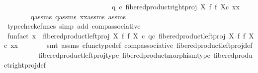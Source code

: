 \begin{isabellebody}
\ \ \ \ \ \ \ \ \ \ \ \ \ \ \ \ \ \ \ \ \ \ \ \ \ \ \ \ \ \ \ q{}\ {\isasymcirc}\isactrlsub c\ {\isacharparenleft}{\kern0pt}{\isacharparenleft}{\kern0pt}fibered{\isacharunderscore}{\kern0pt}product{\isacharunderscore}{\kern0pt}right{\isacharunderscore}{\kern0pt}proj\ X\ f\ f\ X{\isacharparenright}{\kern0pt}{\isasymcirc}\isactrlsub c\ xx{\isacharparenright}{\kern0pt}{\isachardoublequoteclose}\isanewline
\ \ \ \ \ \ \isamarkupfalse%
\ q{}{\isacharunderscore}{\kern0pt}assms\ q{}{\isacharunderscore}{\kern0pt}assms\ xx{\isacharunderscore}{\kern0pt}assms\ assms\ \isamarkupfalse%
\ {\isacharparenleft}{\kern0pt}typecheck{\isacharunderscore}{\kern0pt}cfuncs{\isacharcomma}{\kern0pt}\ simp\ add{\isacharcolon}{\kern0pt}\ comp{\isacharunderscore}{\kern0pt}associative{}{\isacharparenright}{\kern0pt}\isanewline
\ \ \ \ \isamarkupfalse%
\ \isamarkupfalse%
\ fun{\isacharunderscore}{\kern0pt}fact{\isacharcolon}{\kern0pt}\ {\isachardoublequoteopen}x\ {\isacharequal}{\kern0pt}\ {\isacharparenleft}{\kern0pt}{\isacharparenleft}{\kern0pt}fibered{\isacharunderscore}{\kern0pt}product{\isacharunderscore}{\kern0pt}left{\isacharunderscore}{\kern0pt}proj\ X\ f\ f\ X{\isacharparenright}{\kern0pt}\ {\isasymcirc}\isactrlsub c\ q{}{\isacharparenright}{\kern0pt}{\isasymcirc}\isactrlsub c\ {\isacharparenleft}{\kern0pt}{\isacharparenleft}{\kern0pt}{\isacharparenleft}{\kern0pt}fibered{\isacharunderscore}{\kern0pt}product{\isacharunderscore}{\kern0pt}left{\isacharunderscore}{\kern0pt}proj\ X\ f\ f\ X{\isacharparenright}{\kern0pt}{\isasymcirc}\isactrlsub c\ xx{\isacharparenright}{\kern0pt}{\isacharparenright}{\kern0pt}{\isachardoublequoteclose}\isanewline
\ \ \ \ \ \ \isamarkupfalse%
\ {\isacharparenleft}{\kern0pt}smt\ assms{\isacharparenleft}{\kern0pt}{}{\isacharparenright}{\kern0pt}\ cfunc{\isacharunderscore}{\kern0pt}type{\isacharunderscore}{\kern0pt}def\ comp{\isacharunderscore}{\kern0pt}associative{}\ fibered{\isacharunderscore}{\kern0pt}product{\isacharunderscore}{\kern0pt}left{\isacharunderscore}{\kern0pt}proj{\isacharunderscore}{\kern0pt}def\isanewline
\ \ \ \ \ \ \ \ \ \ fibered{\isacharunderscore}{\kern0pt}product{\isacharunderscore}{\kern0pt}left{\isacharunderscore}{\kern0pt}proj{\isacharunderscore}{\kern0pt}type\ fibered{\isacharunderscore}{\kern0pt}product{\isacharunderscore}{\kern0pt}morphism{\isacharunderscore}{\kern0pt}type\ fibered{\isacharunderscore}{\kern0pt}product{\isacharunderscore}{\kern0pt}right{\isacharunderscore}{\kern0pt}proj{\isacharunderscore}{\kern0pt}def\isanewline

\end{isabellebody}
